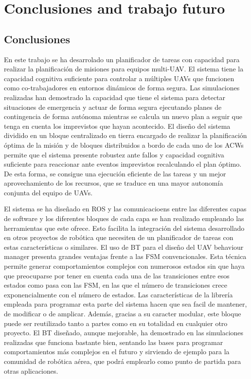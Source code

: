 \documentclass[fontsize=11pt, English=false, Español=true, Myfinal=true, twoside, numbers=noenddot]{scrbook}
\begin{document}
{\chapter{Conclusiones and trabajo futuro}
\label{ch:ConclusionsAndFutureWork}
\section{Conclusiones}
\label{sec:Conclusions}
En este trabajo se ha desarrolado un planificador de tareas con capacidad para realizar la planificación de misiones para equipos multi-UAV. El sistema tiene la capacidad cognitiva suficiente para controlar a múltiples UAVs que funcionen como co-trabajadores en entornos dinámicos de forma segura. Las simulaciones realizadas han demostrado la capacidad que tiene el sistema para detectar situaciones de emergencia y actuar de forma segura ejecutando planes de contingencia de forma autónoma mientras se calcula un nuevo plan a seguir que tenga en cuenta los imprevistos que hayan acontecido. El diseño del sistema dividido en un bloque centralizado en tierra encargado de realizar la planificación óptima de la misión y de bloques distribuidos a bordo de cada uno de los ACWs permite que el sistema presente robustez ante fallos y capacidad cognitiva suficiente para reaccionar ante eventos imprevistos recalculando el plan óptimo. De esta forma, se consigue una ejecución eficiente de las tareas y un mejor aprovechamiento de los recursos, que se traduce en una mayor autonomía conjunta del equipo de UAVs.

El sistema se ha diseñado en ROS y las comunicacioens entre las diferentes capas de software y los diferentes bloques de cada capa se han realizado empleando las herramientas que este ofrece. Esto facilita la integración del sistema desarrollado en otros proyectos de robótica que necesiten de un planificador de tareas con estas características o similares. El uso de BT para el diseño del UAV behaviour manager presenta grandes ventajas frente a las FSM convencionales. Esta técnica permite generar comportamientos complejos con numerosos estados sin que haya que preocuparse por tener en cuenta cada una de las transiciones entre esos estados como pasa con las FSM, en las que el número de transiciones crece exponencialmente con el número de estados. Las características de la librería empleada para programar esta parte del sistema hacen que sea facil de mantener, de modificar o de amplicar. Además, gracias a su caracter modular, este bloque puede ser reutilizado tanto a partes como en su totalidad en cualquier otro proyecto. El BT diseñado, aunque mejorable, ha demostrado en las simulaciones realizadas que funciona bastante bien, sentando las bases para programar comportamientos más complejos en el futuro y sirviendo de ejemplo para la comunidad de robótica aérea, que podrá emplearlo como punto de partida para otras aplicaciones. 

}
\end{document}
